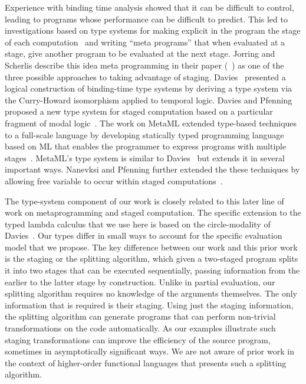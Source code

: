 Experience with binding time analysis showed that it can be difficult
to control, leading to programs whose performance can be difficult to
predict. This led to investigations based on type systems for making
explicit in the program the stage of each
computation~\cite{GJ91-lambda,NN92-twolevel} and writing ``meta
programs'' that when evaluated at a stage, give another program to be
evaluated at the next stage. Jorring and Scherlis describe this idea
meta programming in their paper (~\cite{JS86-staging}) as one of the
three possible approaches to taking advantage of
staging. Davies~\cite{davies96} presented a logical construction of
binding-time type systems by deriving a type system via the
Curry-Howard isomorphism applied to temporal logic.  Davies and
Pfenning proposed a new type system for staged computation based on a
particular fragment of modal logic~\cite{DP01-modal}. The work on
MetaML extended type-based techniques to a full-scale language by
developing statically typed programming language based on ML that
enables the programmer to express programs with multiple
stages~\cite{Taha97,taha-thesis-99}.  MetaML's type system is similar
to Davies~\cite{davies96} but extends it in several important ways.
Nanevksi and Pfenning further extended the these techniques by
allowing free variable to occur within staged
computations~\cite{NP05-nn}.

The type-system component of our work is closely related to this later
line of work on metaprogramming and staged computation.  The specific
extension to the typed lambda calculus that we use here is based on
the circle-modality of Davies~\cite{DP01-modal}.  Our types differ in
small ways to account for the specific evaluation model that we
propose.  The key difference between our work and this prior work is
the staging or the splitting algorithm, which given a two-staged
program splits it into two stages that can be executed sequentially,
passing information from the earlier to the latter stage by
construction. 
%
%
Unlike in partial evaluation, our splitting algorithm requires no
knowledge of the arguments themselves. The only information that is
required is their staging. Using just the staging information, the
splitting algorithm can generate programs that can perform non-trivial
transformations on the code automatically.  As our examples illustrate
such staging transformations can improve the efficiency of the source
program, sometimes in asymptotically significant ways.  
We are not aware of prior work in the context of higher-order
functional languages that presents such a splitting algorithm.

